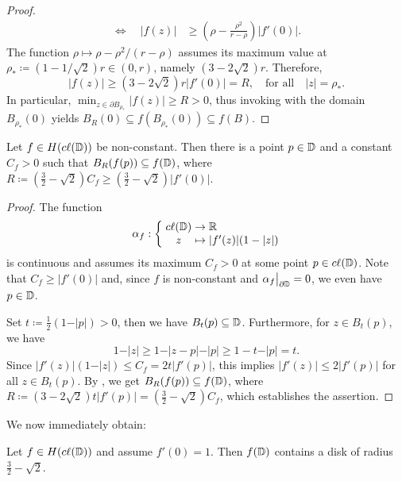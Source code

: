 \begin{proof}
\begin{align*}
        \Longleftrightarrow \quad \vert f(z) \vert &\geq \left( \rho - \frac{\rho^2}{r - \rho} \right) \vert f'(0) \vert.
    \end{align*}
    The function $\rho \mapsto \rho - \rho^2 / (r - \rho)$ assumes its maximum value at $\rho_* \coloneqq (1 - 1 / \sqrt{2})r \in (0, r)$, namely $(3 - 2 \sqrt{2}) r$. Therefore,
    \begin{equation*}
        \vert f(z) \vert \geq (3 - 2 \sqrt{2}) r \vert f'(0) \vert = R, \quad \textrm{for all} \quad \vert z \vert = \rho_*.
    \end{equation*}
    In particular, $\min_{z \in \partial B_{\rho_*}} \vert f(z) \vert \geq R > 0$, thus invoking  with the domain $B_{\rho_*}(0)$ yields $B_{R}(0) \subseteq f(B_{\rho_*}(0)) \subseteq f(B)$.
\end{proof}

\begin{theorem} \label{thm:bloch-stronger}
    Let $f \in H(c\ell({\mathbb{D}}))$ be non-constant. Then there is a point $p \in \mathbb{D}$ and a constant $C_f > 0$ such that $B_{R}(f(p)) \subseteq f(\mathbb{D})$, where $R \coloneqq (\frac{3}{2} - \sqrt{2}) C_f \geq (\frac{3}{2} - \sqrt{2}) \vert f'(0) \vert$.
\end{theorem}

\begin{proof}
    The function
    $$ \mapping{\alpha_f}{\cl{\D} & \to & \R}{z & \mapsto & \vert f'(z) \vert (1 - \vert z \vert)} $$
    is continuous and assumes its maximum $C_f > 0$ at some point $p \in c\ell({\mathbb{D}})$. Note that $C_f \geq \vert f'(0) \vert$ and, since $f$ is non-constant and $\restr{\alpha_f}{\partial \D} = 0$, we even have $p \in \mathbb{D}$.

    Set $t \coloneqq \frac{1}{2}(1 - \vert p \vert) > 0$, then we have $B_{t}(p) \subseteq \mathbb{D}$. Furthermore, for $z \in B_t(p)$, we have
    $$ 1 - \vert z \vert \geq 1 - \vert z - p \vert - \vert p \vert \geq 1 - t - \vert p \vert = t. $$
    Since $\vert f'(z) \vert (1 - \vert z \vert) \leq C_f = 2 t \vert f'(p) \vert$, this implies $\vert f'(z) \vert \leq 2 \vert f'(p) \vert$ for all $z \in B_t(p)$. By , we get $ B_{R}(f(p)) \subseteq f(\mathbb{D}) $, where $R \coloneqq (3 - 2 \sqrt{2}) t \vert f'(p) \vert = ({\textstyle \frac{3}{2}} - \sqrt{2}) C_f$,
    which establishes the assertion.
\end{proof}

We now immediately obtain:    

\begin{theorem}[Bloch] \label{thm:bloch}
    Let $f \in H(c\ell({\mathbb{D}}))$ and assume $f'(0) = 1$. Then $f(\mathbb{D})$ contains a disk of radius $\frac{3}{2} - \sqrt{2}$.
\end{theorem}

